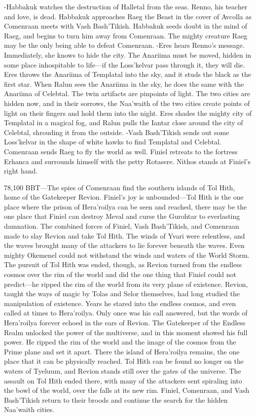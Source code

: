 \documentclass[smalldemyvopaper,11pt,twoside,onecolumn,openright,extrafontsizes]{memoir}
\begin{document}
{{-Habbakuk watches the destruction of Halletal from the seas. Renno, his teacher and love, is dead. Habbakuk approaches Raeg the Beast in the cover of Avcolla as Comenraan meets with Vash Bash’Tikish. Habbakuk seeds doubt in the mind of Raeg, and begins to turn him away from Comenraan. The mighty creature Raeg may be the only being able to defeat Comenraan.
-Eres hears Renno’s message. Immediately, she knows to hide the city. The Anariima must be moved, hidden in some place inhospitable to life—if the Loss’kelvar pass through it, they will die. Eres throws the Anariima of Templatal into the sky, and it studs the black as the first star.  When Ralun sees the Anariima in the sky, he does the same with the Anariima of Celebtal. The twin artifacts are pinpoints of light. The two cities are hidden now, and in their sorrows, the Naa’waith of the two cities create points of light on their fingers and hold them into the night. Eres shades the mighty city of Templatal in a magical fog, and Ralun pulls the Iantar close around the city of Celebtal, shrouding it from the outside.
-Vash Bash’Tikish sends out some Loss’kelvar in the shape of white hawks to find Templatal and Celebtal. Comenraan sends Raeg to fly the world as well. Finiel retreats to the fortress Erhanca and surrounds himself with the petty Rotasere. Nithos stands at Finiel’s right hand.

78,100 BBT—The spies of Comenraan find the southern islands of Tol Hith, home of the Gatekeeper Revion. Finiel’s joy is unbounded—Tol Hith is the one place where the prison of Hera’roilya can be seen and reached, there may be the one place that Finiel can destroy Meval and curse the Gurohtar to everlasting damnation. The combined forces of Finiel, Vash Bash’Tikish, and Comenraan made to slay Revion and take Tol Hith. The winds of Yvari were relentless, and the waves brought many of the attackers to lie forever beneath the waves. Even mighty Okemenel could not withstand the winds and waters of the World Storm. The pursuit of Tol Hith was ended, though, as Revion turned from the endless cosmos over the rim of the world and did the one thing that Finiel could not predict—he ripped the rim of the world from its very plane of existence. Revion, taught the ways of magic by Tolas and Selor themselves, had long studied the manipulation of existence. Years he stared into the endless cosmos, and even called at times to Hera’roilya. Only once was his call answered, but the words of Hera’roilya forever echoed in the ears of Revion. The Gatekeeper of the Endless Realm unlocked the power of the multiverse, and in this moment showed his full power. He ripped the rim of the world and the image of the cosmos from the Prime plane and set it apart. There the island of Hera’roilya remains, the one place that it can be physically reached. Tol Hith can be found no longer on the waters of Tyeluum, and Revion stands still over the gates of the universe. The assault on Tol Hith ended there, with many of the attackers sent spiraling into the bowl of the world, over the falls at its new rim. Finiel, Comenraan, and Vash Bash’Tikish return to their broods and continue the search for the hidden Naa’waith cities.

}}
\end{document}
